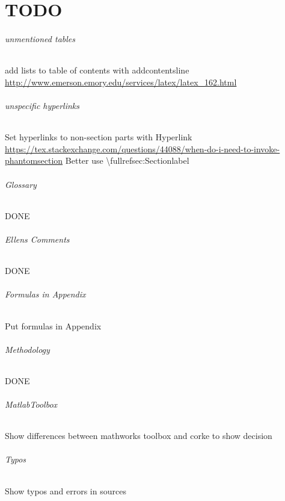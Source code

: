 \part{TODO}

\paragraph{unmentioned tables}
add lists to table of contents with addcontentsline
\url{http://www.emerson.emory.edu/services/latex/latex_162.html}

\paragraph{unspecific hyperlinks}
Set hyperlinks to non-section parts with Hyperlink
\url{https://tex.stackexchange.com/questions/44088/when-do-i-need-to-invoke-phantomsection}
Better use \textbackslash fullref{sec:Sectionlabel}

\paragraph{Glossary}
DONE

\paragraph{Ellens Comments}
DONE

\paragraph{Formulas in Appendix}
Put formulas in Appendix

\paragraph{Methodology}
DONE

\paragraph{MatlabToolbox}
Show differences between mathworks toolbox and corke to show decision

\paragraph{Typos}
Show typos and errors in sources


